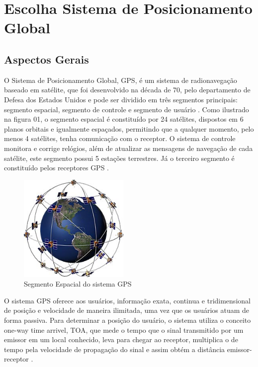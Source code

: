 \chapter[Escolha GPS]{Escolha Sistema de Posicionamento Global}

\section{Aspectos Gerais}

O Sistema de Posicionamento Global, GPS, é um sistema de radionavegação
baseado em satélite, que foi desenvolvido na década de 70, pelo departamento
de Defesa dos Estados Unidos e pode ser dividido em três segmentos principais:
segmento espacial, segmento de controle e segmento de usuário \cite{interferidores_gps}.
Como ilustrado na figura 01, o segmento espacial é constituído por
24 satélites, dispostos em 6 planos orbitais e igualmente espaçados,
permitindo que a qualquer momento, pelo menos 4 satélites, tenha
comunicação com o receptor. O sistema de controle monitora e corrige
relógios, além de atualizar as mensagens de navegação de cada satélite,
este segmento possui 5 estações terrestres. Já o terceiro segmento é
constituído pelos receptores GPS \cite{posicionamento_gnss}.

\begin{figure}[h]
  \centering
  \includegraphics[width=200px, scale=1]{figuras/esquema_gps}
  \caption{Segmento Espacial do sistema GPS \cite{entendendo_gps}}
\label{fig:esquema_gps}
\end{figure}

O sistema GPS oferece aos usuários, informação exata, continua e
tridimensional de posição e velocidade de maneira ilimitada, uma
vez que os usuários atuam de forma passiva. Para determinar a posição
do usuário, o sistema utiliza o conceito one-way time arrivel, TOA, que
mede o tempo que o sinal transmitido por um emissor em um local conhecido,
leva para chegar ao receptor, multiplica o de tempo pela velocidade de
propagação do sinal e assim obtém a distância emissor-receptor \cite{sobre_gps}.

